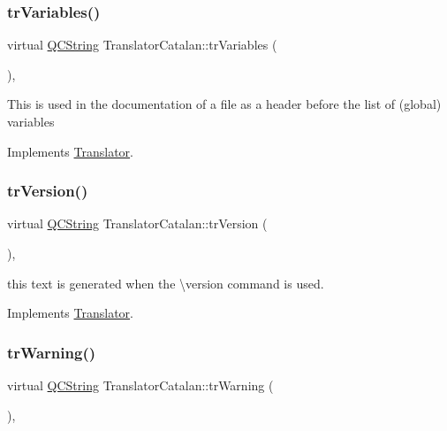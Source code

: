 \mbox{\label{class_translator_catalan_afa02b54cfe1aa712559980718b881c26}} 
\subsubsection{\texorpdfstring{trVariables()}{trVariables()}}
{\footnotesize\ttfamily virtual \mbox{\hyperlink{class_q_c_string}{Q\+C\+String}} Translator\+Catalan\+::tr\+Variables (\begin{DoxyParamCaption}{ }\end{DoxyParamCaption})\hspace{0.3cm}{\ttfamily [inline]}, {\ttfamily [virtual]}}

This is used in the documentation of a file as a header before the list of (global) variables 

Implements \mbox{\hyperlink{class_translator}{Translator}}.

\mbox{\label{class_translator_catalan_a705a9e74ea93194c1aba6759d466b3f0}} 
\subsubsection{\texorpdfstring{trVersion()}{trVersion()}}
{\footnotesize\ttfamily virtual \mbox{\hyperlink{class_q_c_string}{Q\+C\+String}} Translator\+Catalan\+::tr\+Version (\begin{DoxyParamCaption}{ }\end{DoxyParamCaption})\hspace{0.3cm}{\ttfamily [inline]}, {\ttfamily [virtual]}}

this text is generated when the \textbackslash{}version command is used. 

Implements \mbox{\hyperlink{class_translator}{Translator}}.

\mbox{\label{class_translator_catalan_a360b272f195bf77a96b6379a0415d1bc}} 
\subsubsection{\texorpdfstring{trWarning()}{trWarning()}}
{\footnotesize\ttfamily virtual \mbox{\hyperlink{class_q_c_string}{Q\+C\+String}} Translator\+Catalan\+::tr\+Warning (\begin{DoxyParamCaption}{ }\end{DoxyParamCaption})\hspace{0.3cm}{\ttfamily [inline]}, {\ttfamily [virtual]}}

